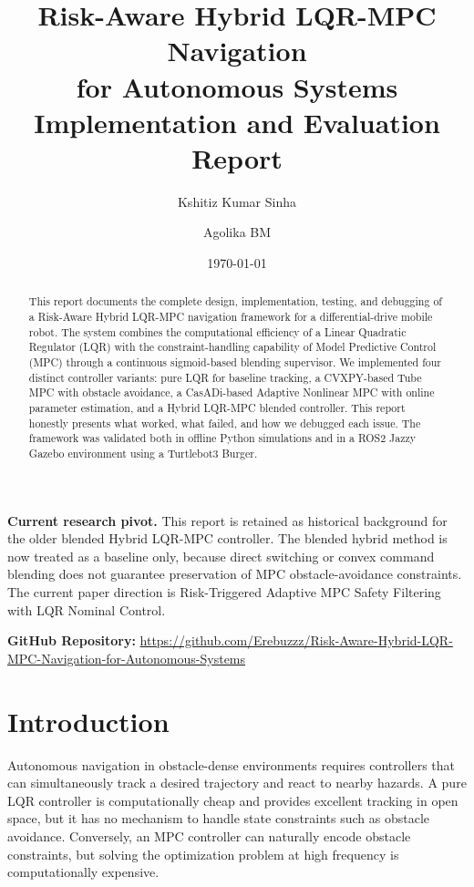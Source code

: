 \documentclass[12pt, a4paper]{article}
\title{\textbf{Risk-Aware Hybrid LQR-MPC Navigation\\for Autonomous Systems}\\[0.5em]\large Implementation and Evaluation Report}
\author{Kshitiz Kumar Sinha \and Agolika BM}
\date{\today}
\begin{document}
\maketitle

\begin{abstract}
This report documents the complete design, implementation, testing, and debugging of a Risk-Aware Hybrid LQR-MPC navigation framework for a differential-drive mobile robot. The system combines the computational efficiency of a Linear Quadratic Regulator (LQR) with the constraint-handling capability of Model Predictive Control (MPC) through a continuous sigmoid-based blending supervisor. We implemented four distinct controller variants: pure LQR for baseline tracking, a CVXPY-based Tube MPC with obstacle avoidance, a CasADi-based Adaptive Nonlinear MPC with online parameter estimation, and a Hybrid LQR-MPC blended controller. This report honestly presents what worked, what failed, and how we debugged each issue. The framework was validated both in offline Python simulations and in a ROS2 Jazzy Gazebo environment using a Turtlebot3 Burger.
\end{abstract}

\noindent\textbf{Current research pivot.}
This report is retained as historical background for the older blended Hybrid
LQR-MPC controller. The blended hybrid method is now treated as a baseline only,
because direct switching or convex command blending does not guarantee
preservation of MPC obstacle-avoidance constraints. The current paper direction
is Risk-Triggered Adaptive MPC Safety Filtering with LQR Nominal Control.

\vspace{0.3cm}
\noindent\textbf{GitHub Repository:} \url{https://github.com/Erebuzzz/Risk-Aware-Hybrid-LQR-MPC-Navigation-for-Autonomous-Systems}

\tableofcontents
\newpage

\section{Introduction}

Autonomous navigation in obstacle-dense environments requires controllers that can simultaneously track a desired trajectory and react to nearby hazards. A pure LQR controller is computationally cheap and provides excellent tracking in open space, but it has no mechanism to handle state constraints such as obstacle avoidance. Conversely, an MPC controller can naturally encode obstacle constraints, but solving the optimization problem at high frequency is computationally expensive.
\end{document}
